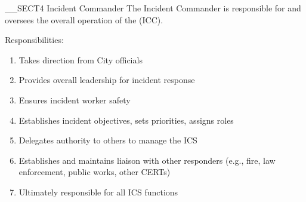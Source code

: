 __SECT4{ \huge Incident Commander 
\label{sec:IncidentCommander} } %
The Incident Commander is responsible for and oversees 
the overall operation of the \IncidentCommandCenter(ICC).

Responsibilities:
\begin{enumerate}
\item Takes direction from City officials
\item Provides overall leadership for incident response
\item Ensures incident worker safety
\item Establishes incident objectives, sets priorities, assigns roles
\item Delegates authority to others to manage the ICS
\item Establishes and maintains liaison with other responders (e.g., fire, law enforcement, public works, other CERTs)
\item Ultimately responsible for all ICS functions 
\end{enumerate}
